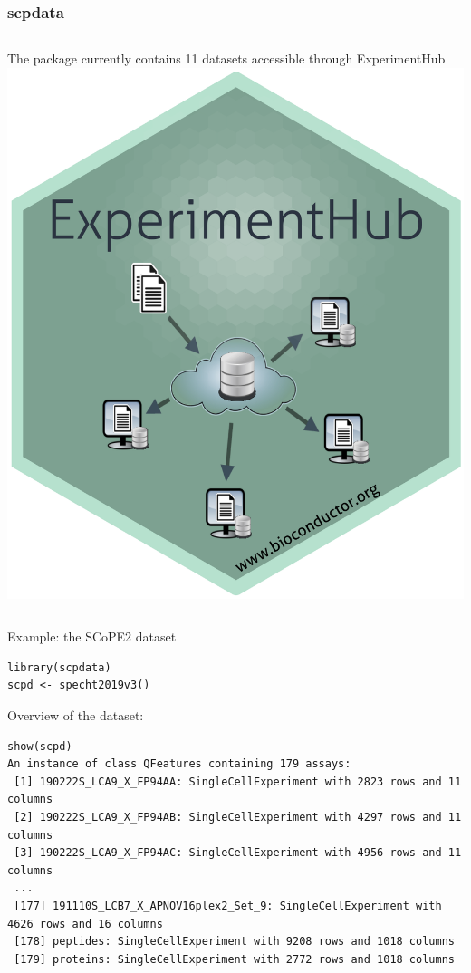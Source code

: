 \documentclass{beamer}
\newcommand{\hcode}[2][lgray]{{\ttfamily\color{vdgray}\colorbox{#1}{#2}}}
\begin{document}
\begin{frame}[fragile]
  \frametitle{\hcode{scpdata}}

  \begin{columns}
    The package currently contains 11 datasets accessible through 
    \hcode{ExperimentHub}
    \includegraphics[width=\linewidth]{figs/sticker_EH.png}
  \end{columns}
  
  \vfill
  Example: the SCoPE2 dataset
  
  \vfill
  \begin{lstlisting}
library(scpdata)
scpd <- specht2019v3()
  \end{lstlisting}
  
  \vfill
  Overview of the dataset:
  
  \begin{lstlisting}[language={}]
show(scpd)
An instance of class QFeatures containing 179 assays:
 [1] 190222S_LCA9_X_FP94AA: SingleCellExperiment with 2823 rows and 11 columns 
 [2] 190222S_LCA9_X_FP94AB: SingleCellExperiment with 4297 rows and 11 columns 
 [3] 190222S_LCA9_X_FP94AC: SingleCellExperiment with 4956 rows and 11 columns 
 ...
 [177] 191110S_LCB7_X_APNOV16plex2_Set_9: SingleCellExperiment with 4626 rows and 16 columns 
 [178] peptides: SingleCellExperiment with 9208 rows and 1018 columns 
 [179] proteins: SingleCellExperiment with 2772 rows and 1018 columns 
  \end{lstlisting}
  
\end{frame}
 
\end{document}
